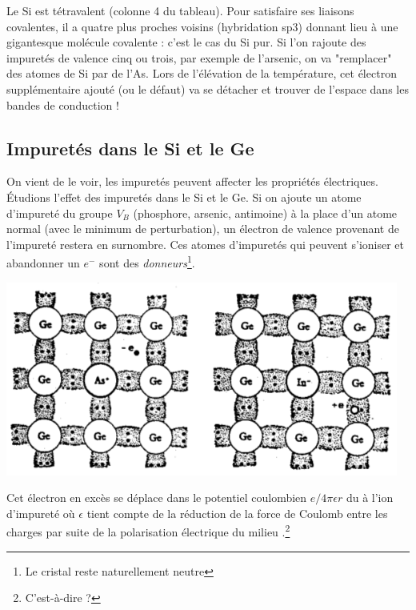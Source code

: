 		Le Si est tétravalent (colonne 4 du tableau). Pour satisfaire ses liaisons 
		covalentes, il a quatre plus proches voisins (hybridation sp3) donnant lieu 
		à une gigantesque molécule covalente : c'est le cas du Si pur. Si l'on 
		rajoute des impuretés de valence cinq ou trois, par exemple de l'arsenic, 
		on va "remplacer" des atomes de Si par de l'As. Lors de l'élévation de la 
		température, cet électron supplémentaire ajouté (ou le défaut) va se détacher 
		et trouver de l'espace dans les bandes de conduction !
		
		\subsection{Impuretés dans le Si et le Ge}
		On vient de le voir, les impuretés peuvent affecter les propriétés électriques. 
		Étudions l'effet des impuretés dans le Si et le Ge. Si on ajoute un atome 
		d'impureté du groupe $V_B$ (phosphore, arsenic, antimoine) à la place d'un atome
		normal (avec le minimum de perturbation), un électron de valence provenant de 
		l'impureté restera en surnombre. Ces atomes d'impuretés qui peuvent s'ioniser 
		et abandonner un $e^-$ sont des \textit{donneurs}\footnote{Le cristal reste 
		naturellement neutre}.
		\begin{center}
		\includegraphics[scale=0.4]{ch8/image3.png}
		\end{center}						
		\newpage
		
		Cet électron en excès se déplace dans le potentiel coulombien $e/4\pi\epsilon r$ 
		du à l'ion d'impureté où $\epsilon$ tient compte de la réduction de la force 
		de Coulomb entre les charges par suite de la polarisation électrique du milieu
		.\footnote{C'est-à-dire ?}\\
		
